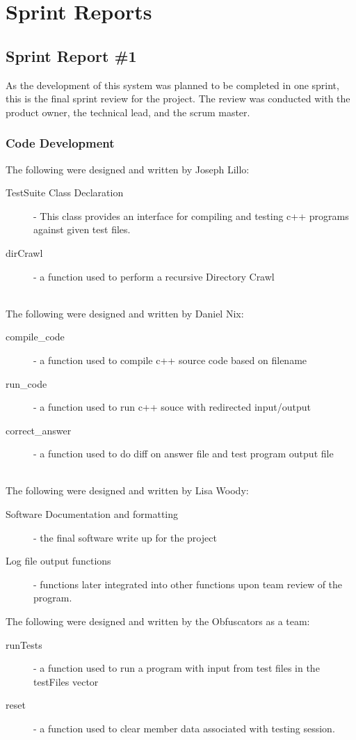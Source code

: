
\chapter{Sprint Reports}
\section{Sprint Report \#1}
As the development of this system was planned to be completed in one sprint, this is the final sprint review for the project. 
The review was conducted with the product owner, the technical lead, and the scrum master. \\

\subsection{Code Development}
The following were designed and written by Joseph Lillo:
\begin{description}
\item [TestSuite Class Declaration]- This class provides an interface for compiling and testing c++ programs against given test files.
\item [dirCrawl] - a function used to perform a recursive Directory Crawl \\ \\
\end{description}
The following were designed and written by Daniel Nix:
\begin{description}
\item [compile\_code] - a function used to compile c++ source code based on filename
\item [run\_code]- a function used to run c++ souce with redirected input/output
\item [correct\_answer]- a function used to do diff on answer file and test program output file \\  \\
\end{description}
The following were designed and written by Lisa Woody:
\begin{description}
\item [Software Documentation and formatting] - the final software write up for the project
\item [Log file output functions]-  functions later integrated into other functions upon team review of the program. \\
\end{description}
The following were designed and written by the Obfuscators as a team:
\begin{description}
\item [runTests] - a function used to run a program with input from test files in the testFiles vector
\item [reset]-  a function used to clear member data associated with testing session.
\end{description}




